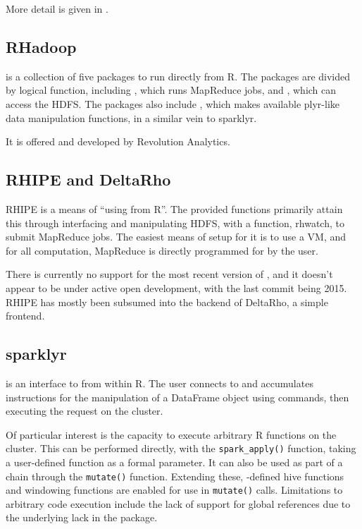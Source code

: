More detail is given in \cite{pbdBASEvignette}.

\hypertarget{sec:rhadoop}{%
    \subsection{RHadoop}\label{sec:rhadoop}}

  is a collection of five packages to run  directly from
R\cite{analytics:_rhadoop_wiki}. The packages are divided by logical
function, including , which runs MapReduce jobs, and , which
can access the HDFS. The packages also include , which makes
available plyr-like data manipulation functions, in a similar vein to
{sparklyr}.

It is offered and developed by Revolution Analytics.

\hypertarget{sec:rhipe-deltarho}{%
    \subsection{RHIPE and DeltaRho}\label{sec:rhipe-deltarho}}

RHIPE is a means of ``using  from R''\cite{deltarho:_rhipe}. The
provided functions primarily attain this through interfacing and
manipulating HDFS, with a function, rhwatch, to submit MapReduce jobs.
The easiest means of setup for it is to use a VM, and for all 
computation, MapReduce is directly programmed for by the user.

There is currently no support for the most recent version of , and
it doesn't appear to be under active open development, with the last
commit being 2015. RHIPE has mostly been subsumed into the backend of
DeltaRho, a simple frontend.

\hypertarget{sparklyr}{%
    \subsection{sparklyr}\label{sparklyr}}

 is an interface to  from within R\cite{luraschi20}. The
user connects to  and accumulates instructions for the manipulation
of a  DataFrame object using  commands, then executing the
request on the  cluster.

Of particular interest is the capacity to execute arbitrary R functions
on the  cluster. This can be performed directly, with the
\texttt{spark_apply()} function, taking a
user-defined function as a formal parameter. It can also be used as part
of a  chain through the \texttt{mutate()}
function. Extending these, -defined hive functions and windowing
functions are enabled for use in
\texttt{mutate()} calls. Limitations to
arbitrary code execution include the lack of support for global
references due to the underlying lack in the  package.

